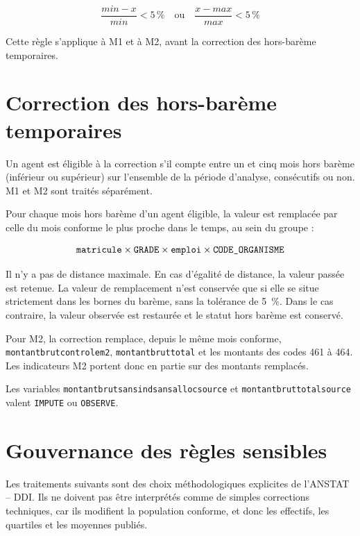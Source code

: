 \documentclass[12pt,a4paper,french]{article}
\renewcommand{\_}{\underscoreorigine\allowbreak}
\begin{document}
\[
\frac{min - x}{min} < 5\,\% \quad \text{ou} \quad \frac{x - max}{max} < 5\,\%
\]

Cette règle s'applique à M1 et à M2, avant la correction des hors-barème temporaires.

\section{Correction des hors-barème temporaires}\label{sec:horsbareme}

Un agent est éligible à la correction s'il compte entre un et cinq mois hors barème (inférieur ou supérieur) sur l'ensemble de la période d'analyse, consécutifs ou non. M1 et M2 sont traités séparément.

Pour chaque mois hors barème d'un agent éligible, la valeur est remplacée par celle du mois conforme le plus proche dans le temps, au sein du groupe :

\[
\texttt{matricule} \times \texttt{GRADE} \times \texttt{emploi} \times \texttt{CODE\_ORGANISME}
\]

Il n'y a pas de distance maximale. En cas d'égalité de distance, la valeur passée est retenue. La valeur de remplacement n'est conservée que si elle se situe strictement dans les bornes du barème, sans la tolérance de 5~\%. Dans le cas contraire, la valeur observée est restaurée et le statut hors barème est conservé.

Pour M2, la correction remplace, depuis le même mois conforme, \texttt{montant\_brut\_controle\_m2}, \texttt{montant\_brut\_total} et les montants des codes 461 à 464. Les indicateurs M2 portent donc en partie sur des montants remplacés.

Les variables \texttt{montant\_brut\_sans\_ind\_sans\_alloc\_source} et \texttt{montant\_brut\_total\_source} valent \texttt{IMPUTE} ou \texttt{OBSERVE}.

\section{Gouvernance des règles sensibles}

Les traitements suivants sont des choix méthodologiques explicites de l'ANSTAT -- DDI. Ils ne doivent pas être interprétés comme de simples corrections techniques, car ils modifient la population conforme, et donc les effectifs, les quartiles et les moyennes publiés.
\end{document}

